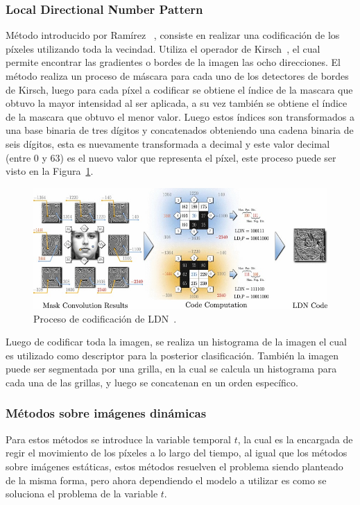 		\subsubsection{Local Directional Number Pattern}
		\label{sec:ldn}
		Método introducido por Ramírez \etal~\cite{RamirezRivera2013}, consiste en realizar una codificación de los píxeles utilizando toda la vecindad. Utiliza el operador de Kirsch~\cite{Kirsch1971}, el cual permite encontrar las gradientes o bordes de la imagen las ocho direcciones. El método realiza un proceso de máscara para cada uno de los detectores de bordes de Kirsch, luego para cada píxel a codificar se obtiene el índice de la mascara que obtuvo la mayor intensidad al ser aplicada, a su vez también se obtiene el índice de la mascara que obtuvo el menor valor. Luego estos índices son transformados a una base binaria de tres dígitos y concatenados obteniendo una cadena binaria de seis dígitos, esta es nuevamente transformada a decimal y este valor decimal (entre 0 y 63) es el nuevo valor que representa el píxel, este proceso puede ser visto en la Figura~\ref{art:fig:ldn}.
		
\begin{figure}[tb]
  \centering
   \includegraphics[width=1\textwidth]{Figuras/ldn.jpg}
  \caption{Proceso de codificación de LDN~\cite{RamirezRivera2013}.}
  \label{art:fig:ldn}
\end{figure}

		Luego de codificar toda la imagen, se realiza un histograma de la imagen el cual es utilizado como descriptor para la posterior clasificación. También la imagen puede ser segmentada por una grilla, en la cual se calcula un histograma para cada una de las grillas, y luego se concatenan en un orden específico.

	\subsubsection{Métodos sobre imágenes dinámicas}	
	\label{sec:met_videos}
	Para estos métodos se introduce la variable temporal $t$, la cual es la encargada de regir el movimiento de los píxeles a lo largo del tiempo, al igual que los métodos sobre imágenes estáticas, estos métodos resuelven el problema siendo planteado de la misma forma, pero ahora dependiendo el modelo a utilizar es como se soluciona el problema de la variable $t$.

